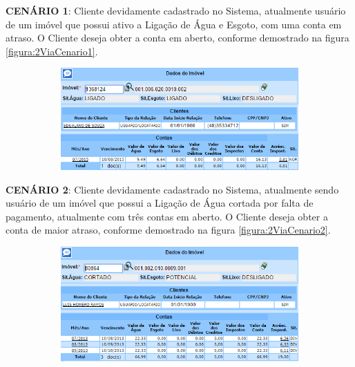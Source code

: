 \begin{flushleft}
	\begin{description}
		\item \textbf{CENÁRIO 1}: Cliente devidamente cadastrado no Sistema, atualmente usuário de um imóvel que possui ativo a Ligação de Água e Esgoto, com uma conta em atraso. O Cliente deseja obter a conta em aberto, conforme demostrado na figura \ref{figura:2ViaCenario1}.
		
		\begin{figure}[H]
			\centering
			\caption{\textbf{Obter 2ª via - Cenário de Teste 1}}
			\label{figura:2ViaCenario1}
			\begin{subfigure}[H]{\textwidth}
				\centering
				\includegraphics{figuras/cenarios/segunda_via/cenario_1.PNG}
			\end{subfigure}
		\end{figure}
	\end{description}
	
	\begin{description}
		\item \textbf{CENÁRIO 2}: Cliente devidamente cadastrado no Sistema, atualmente sendo usuário de um imóvel que possui a Ligação de Água cortada por falta de pagamento, atualmente com três contas em aberto. O Cliente deseja obter a conta de maior atraso, conforme demostrado na figura \ref{figura:2ViaCenario2}.
		\begin{figure}[H]
			\centering
			\caption{\textbf{Obter 2ª via - Cenário de Teste 2}}
			\label{figura:2ViaCenario2}
			\begin{subfigure}[H]{\textwidth}
				\centering
				\includegraphics{figuras/cenarios/segunda_via/cenario_2.PNG}
				\legend {\fontsize{10}{12}\selectfont {Fonte: Autoria Própria}.}	
			\end{subfigure}
		\end{figure}
	\end{description}
	

\end{flushleft}

